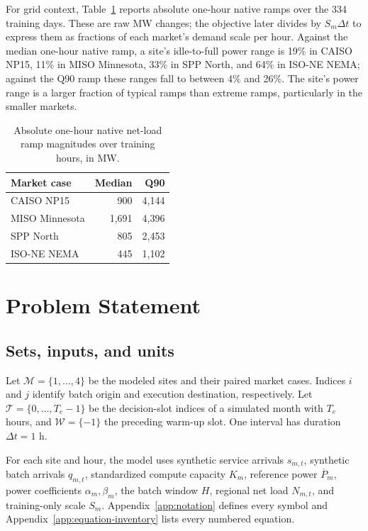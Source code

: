 \documentclass[conference]{IEEEtran}
\begin{document}
For grid context, Table~\ref{tab:native-ramp-scale} reports absolute one-hour
native ramps over the 334 training days. These are raw MW changes; the
objective later divides by \(S_m\Delta t\) to express them as fractions of
each market's demand scale per hour.
Against the median one-hour native ramp, a site's idle-to-full power range
is 19\% in CAISO NP15,
11\% in MISO Minnesota, 33\% in SPP North, and 64\% in ISO-NE NEMA; against
the Q90 ramp these ranges fall to between 4\% and 26\%. The site's power
range is a larger fraction of typical ramps than extreme ramps, particularly
in the smaller markets.

\begin{table}[htbp]
  \centering
  \footnotesize
  \caption{Absolute one-hour native net-load ramp magnitudes over training
  hours, in MW.}
  \label{tab:native-ramp-scale}
  \begin{tabular}{@{}lrr@{}}
    \toprule
    Market case & Median & Q90 \\
    \midrule
    CAISO NP15     & 900   & 4,144 \\
    MISO Minnesota & 1,691 & 4,396 \\
    SPP North      & 805   & 2,453 \\
    ISO-NE NEMA    & 445   & 1,102 \\
    \bottomrule
  \end{tabular}
\end{table}


\section{Problem Statement}
\label{sec:problem-statement}

\subsection{Sets, inputs, and units}
\label{subsec:problem-given-inputs}

Let \(\mathcal M=\{1,\ldots,4\}\) be the modeled sites and their paired market
cases. Indices \(i\) and \(j\) identify batch origin and execution
destination, respectively. Let
\(\mathcal T=\{0,\ldots,T_e-1\}\) be the decision-slot indices of a simulated
month with \(T_e\) hours, and \(\mathcal W=\{-1\}\) the preceding warm-up
slot. One interval has duration \(\Delta t=1\) h.

For each site and hour, the model uses synthetic service arrivals
\(s_{m,t}\), synthetic batch arrivals \(q_{m,t}\), standardized compute
capacity \(K_m\), reference power \(\overline P_m\), power coefficients
\(\alpha_m,\beta_m\), the batch window \(H\), regional net load \(N_{m,t}\),
and training-only scale \(S_m\). Appendix~\ref{app:notation} defines every symbol
and Appendix~\ref{app:equation-inventory} lists every numbered equation.
\end{document}
